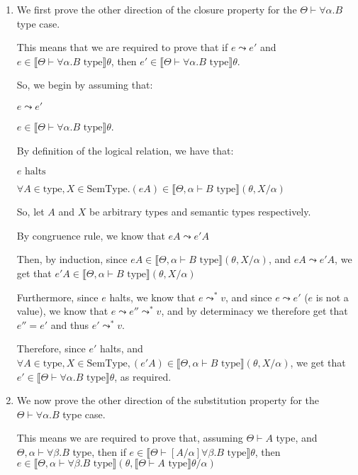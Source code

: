 


\begin{enumerate}
  \item

    We first prove the other direction of the closure property for the $\Theta \vdash \forall \alpha. B$ type case.

    This means that we are required to prove that if $e \leadsto e'$ and $e \in \llbracket \Theta \vdash \forall \alpha. B \text{ type}\rrbracket \theta$, then $e' \in \llbracket \Theta \vdash \forall \alpha. B \text{ type}\rrbracket \theta$.

    So, we begin by assuming that:

    $e \leadsto e'$

    $e \in \llbracket \Theta \vdash \forall \alpha. B \text{ type}\rrbracket \theta$.

    By definition of the logical relation, we have that:

    $e \text{ halts}$

    $\forall A \in \text{type}, X \in \text{SemType}. (e A) \in \llbracket\Theta, \alpha \vdash B \text{ type}\rrbracket (\theta, X / \alpha)$

    So, let $A$ and $X$ be arbitrary types and semantic types respectively.

    By congruence rule, we know that $e A \leadsto e' A$

    Then, by induction, since $e A \in \llbracket \Theta,\alpha \vdash B \text{ type}\rrbracket (\theta, X / \alpha)$, and $e A \leadsto e' A$, we get that $e' A \in \llbracket \Theta, \alpha \vdash B \text{ type}\rrbracket(\theta, X / \alpha)$

    Furthermore, since $e$ halts, we know that $e \leadsto^* v$, and since $e \leadsto e'$ ($e$ is not a value), we know that $e \leadsto e'' \leadsto^* v$, and by determinacy we therefore get that $e'' = e'$ and thus $e' \leadsto^* v$.

    Therefore, since $e'$ halts, and $\forall A \in \text{type}, X \in \text{SemType}, (e' A) \in \llbracket \Theta, \alpha \vdash B \text{ type}\rrbracket (\theta, X / \alpha)$, we get that $e' \in \llbracket \Theta \vdash \forall \alpha. B \text{ type}\rrbracket \theta$, as required.

  \item
    We now prove the other direction of the substitution property for the $\Theta \vdash \forall \alpha. B$ type case.

    This means we are required to prove that, assuming $\Theta \vdash A$ type, and $\Theta, \alpha \vdash \forall \beta. B$ type, then if $e \in \llbracket \Theta \vdash [A / \alpha] \forall \beta. B \text{ type}\rrbracket \theta$, then $e \in \llbracket \Theta, \alpha \vdash \forall \beta. B \text{ type}\rrbracket(\theta, \llbracket \Theta  \vdash A \text{ type}\rrbracket \theta / \alpha)$


\end{enumerate}
